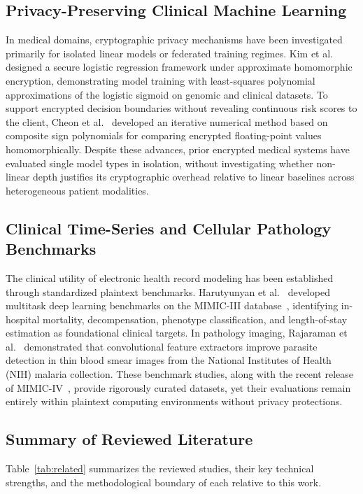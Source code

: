 \documentclass[conference]{IEEEtran}
\begin{document}
\subsection{Privacy-Preserving Clinical Machine Learning}
In medical domains, cryptographic privacy mechanisms have been investigated primarily for isolated linear models or federated training regimes. Kim et al.~\cite{kim2018} designed a secure logistic regression framework under approximate homomorphic encryption, demonstrating model training with least-squares polynomial approximations of the logistic sigmoid on genomic and clinical datasets. To support encrypted decision boundaries without revealing continuous risk scores to the client, Cheon et al.~\cite{cheon2019} developed an iterative numerical method based on composite sign polynomials for comparing encrypted floating-point values homomorphically. Despite these advances, prior encrypted medical systems have evaluated single model types in isolation, without investigating whether non-linear depth justifies its cryptographic overhead relative to linear baselines across heterogeneous patient modalities.

\subsection{Clinical Time-Series and Cellular Pathology Benchmarks}
The clinical utility of electronic health record modeling has been established through standardized plaintext benchmarks. Harutyunyan et al.~\cite{harutyunyan2019} developed multitask deep learning benchmarks on the MIMIC-III database~\cite{mimiciii2016}, identifying in-hospital mortality, decompensation, phenotype classification, and length-of-stay estimation as foundational clinical targets. In pathology imaging, Rajaraman et al.~\cite{rajaraman2018} demonstrated that convolutional feature extractors improve parasite detection in thin blood smear images from the National Institutes of Health (NIH) malaria collection. These benchmark studies, along with the recent release of MIMIC-IV~\cite{mimiciv2023}, provide rigorously curated datasets, yet their evaluations remain entirely within plaintext computing environments without privacy protections.

\subsection{Summary of Reviewed Literature}
Table~\ref{tab:related} summarizes the reviewed studies, their key technical strengths, and the methodological boundary of each relative to this work.
\end{document}

